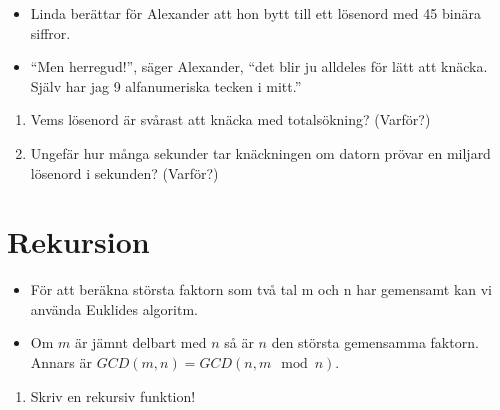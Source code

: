 \begin{frame}
  \begin{exercise}
    \begin{itemize}
      \item Linda berättar för Alexander att hon bytt till ett lösenord med 45 
        binära siffror.
      \item \enquote{Men herregud!}, säger Alexander, \enquote{det blir ju 
          alldeles för lätt att knäcka. Själv har jag 9 alfanumeriska tecken i 
        mitt.}
    \end{itemize}
    \begin{enumerate}
      \item Vems lösenord är svårast att knäcka med totalsökning? (Varför?)
      \item Ungefär hur många sekunder tar knäckningen om datorn prövar en 
        miljard lösenord i sekunden? (Varför?)
    \end{enumerate}
  \end{exercise}
\end{frame}


\section{Rekursion}

\begin{frame}
  \begin{exercise}
    \begin{itemize}
      \item För att beräkna största faktorn som två tal m och n har gemensamt 
        kan vi använda Euklides algoritm.
      \item Om \(m\) är jämnt delbart med \(n\) så är \(n\) den största 
        gemensamma faktorn.
        Annars är \(GCD(m, n) = GCD(n, m\mod n)\).
    \end{itemize}
    \begin{enumerate}
      \item Skriv en rekursiv funktion!
    \end{enumerate}
  \end{exercise}
\end{frame}

\begin{frame}[fragile]
  \begin{solution}
    \inputminted{python}{src/gcd.py}
  \end{solution}
\end{frame}

